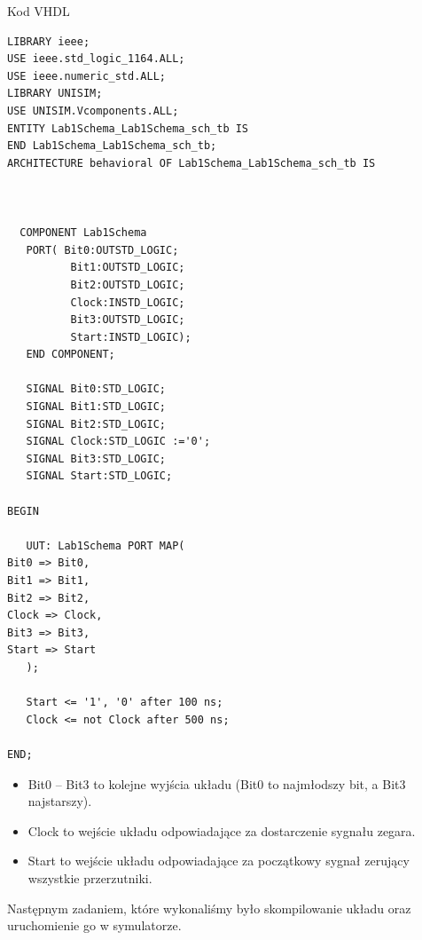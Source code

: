\documentclass[12pt,a4paper,titlepage]{article}
\begin{document}
\begin{listing}[H]
\caption{Kod VHDL}
\begin{verbatim}
LIBRARY ieee; 
USE ieee.std_logic_1164.ALL; 
USE ieee.numeric_std.ALL; 
LIBRARY UNISIM; 
USE UNISIM.Vcomponents.ALL; 
ENTITY Lab1Schema_Lab1Schema_sch_tb IS 
END Lab1Schema_Lab1Schema_sch_tb; 
ARCHITECTURE behavioral OF Lab1Schema_Lab1Schema_sch_tb IS  
 
  
 
  COMPONENT Lab1Schema 
   PORT( Bit0:OUTSTD_LOGIC;  
          Bit1:OUTSTD_LOGIC;  
          Bit2:OUTSTD_LOGIC;  
          Clock:INSTD_LOGIC;  
          Bit3:OUTSTD_LOGIC;  
          Start:INSTD_LOGIC); 
   END COMPONENT; 
 
   SIGNAL Bit0:STD_LOGIC; 
   SIGNAL Bit1:STD_LOGIC; 
   SIGNAL Bit2:STD_LOGIC; 
   SIGNAL Clock:STD_LOGIC :='0'; 
   SIGNAL Bit3:STD_LOGIC; 
   SIGNAL Start:STD_LOGIC; 
 
BEGIN 
 
   UUT: Lab1Schema PORT MAP( 
Bit0 => Bit0,  
Bit1 => Bit1,  
Bit2 => Bit2,  
Clock => Clock,  
Bit3 => Bit3,  
Start => Start 
   ); 
 
   Start <= '1', '0' after 100 ns; 
   Clock <= not Clock after 500 ns; 
 
END; 
\end{verbatim}
\end{listing}

\begin{itemize}
    \item Bit0 -- Bit3 to kolejne wyjścia układu (Bit0 to najmłodszy bit, a Bit3 najstarszy).
    \item Clock to wejście układu odpowiadające za dostarczenie sygnału zegara.
    \item Start to wejście układu odpowiadające za początkowy sygnał zerujący wszystkie przerzutniki.
\end{itemize}
Następnym zadaniem, które wykonaliśmy było skompilowanie układu oraz uruchomienie go w symulatorze.  
\end{document}
